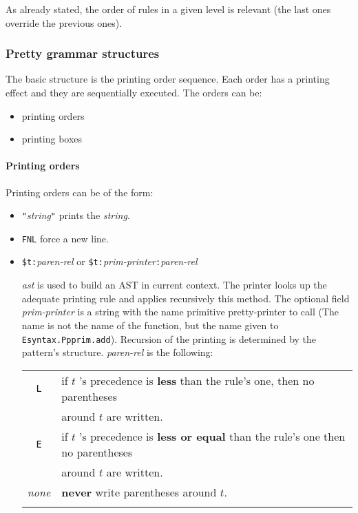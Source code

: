 As already stated, the order of rules in a given level is relevant
(the last ones override the previous ones).

 
\subsubsection{Pretty grammar structures}
The basic structure is the printing order sequence. Each order has a
printing effect and they are sequentially executed. The orders can
be:
\begin{itemize}
\item printing orders
\item printing boxes
\end{itemize}

\paragraph{Printing orders}
Printing orders can be of the form:
\begin{itemize}
\item \verb+"+{\sl string}\verb+"+ prints the {\sl string}.
\item \verb+FNL+ force a new line.

\item \texttt{\$t:}\textsl{paren-rel} or
  \texttt{\$t:}\textsl{prim-printer}\texttt{:}\textsl{paren-rel}

  {\sl ast} is used to build an AST in current context. The printer
  looks up the adequate printing rule and applies recursively this
  method.  The optional field {\it prim-printer} is a string with the
  name primitive pretty-printer to call (The name is not the name of
  the {\ocaml} function, but the name given to {\tt
  Esyntax.Ppprim.add}).  Recursion of the printing is determined by
  the pattern's structure.  {\it paren-rel} is the following:

\begin{tabular}{cl}

\verb+L+ &
    if $t$ 's precedence is {\bf less} than the rule's one, then no
    parentheses \\
  & around $t$ are written. \\
\verb+E+  &
    if $t$ 's precedence is {\bf less or equal} than  the rule's one
    then no parentheses \\
 &  around $t$ are written. \\
{\it none} & {\bf never} write parentheses around $t$.
\\\\
\end{tabular}
\end{itemize}

